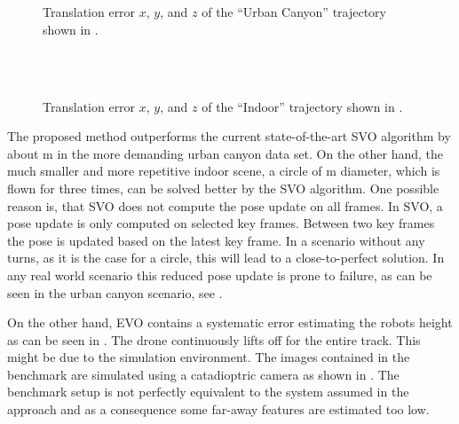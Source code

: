 \begin{figure}[]
  \centering
  \vspace{0.25cm}\\
  \vspace{0.25cm}\\
  
  \caption{Translation error $x$, $y$, and $z$ of the ``Urban Canyon'' trajectory shown in .}
  \label{fig:robot_experiments_urban_translationerror}
\end{figure}

\begin{figure}[]
  \centering
  \vspace{0.25cm}\\
  \vspace{0.25cm}\\
  
  \caption{Translation error $x$, $y$, and $z$ of the ``Indoor'' trajectory shown in .}
  \label{fig:robot_experiments_indoor_translationerror}
\end{figure}

The proposed method outperforms the current state-of-the-art SVO algorithm by about \unit[30]{m} in the more demanding urban canyon data set.
On the other hand, the much smaller and more repetitive indoor scene, a circle of \unit[3]{m} diameter, which is flown for three times, can be solved better by the SVO algorithm.
One possible reason is, that SVO does not compute the pose update on all frames.
In SVO, a pose update is only computed on selected key frames.
Between two key frames the pose is updated based on the latest key frame.
In a scenario without any turns, as it is the case for a circle, this will lead to a close-to-perfect solution.
In any real world scenario this reduced pose update is prone to failure, as can be seen in the urban canyon scenario, see .

On the other hand, EVO contains a systematic error estimating the robots height as can be seen in .
The drone continuously lifts off for the entire track.
This might be due to the simulation environment.
The images contained in the benchmark are simulated using a catadioptric camera as shown in .
The benchmark setup is not perfectly equivalent to the system assumed in the approach and as a consequence some far-away features are estimated too low.





